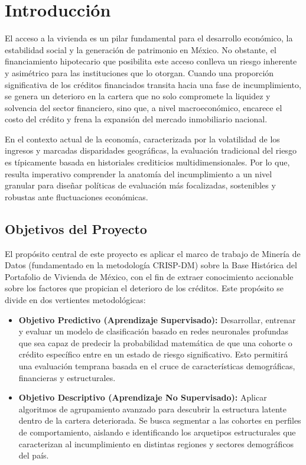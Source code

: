 \section{Introducción}

El acceso a la vivienda es un pilar fundamental para el desarrollo económico, la estabilidad social y la generación de patrimonio en México. No obstante, el financiamiento hipotecario que posibilita este acceso conlleva un riesgo inherente y asimétrico para las instituciones que lo otorgan. Cuando una proporción significativa de los créditos financiados transita hacia una fase de incumplimiento, se genera un deterioro en la cartera que no solo compromete la liquidez y solvencia del sector financiero, sino que, a nivel macroeconómico, encarece el costo del crédito y frena la expansión del mercado inmobiliario nacional. 

En el contexto actual de la economía, caracterizada por la volatilidad de los ingresos y marcadas disparidades geográficas, la evaluación tradicional del riesgo es típicamente basada en historiales crediticios multidimensionales. Por lo que, resulta imperativo comprender la anatomía del incumplimiento a un nivel granular para diseñar políticas de evaluación más focalizadas, sostenibles y robustas ante fluctuaciones económicas.

\subsection{Objetivos del Proyecto}
El propósito central de este proyecto es aplicar el marco de trabajo de Minería de Datos (fundamentado en la metodología CRISP-DM) sobre la Base Histórica del Portafolio de Vivienda de México, con el fin de extraer conocimiento accionable sobre los factores que propician el deterioro de los créditos. Este propósito se divide en dos vertientes metodológicas:

\begin{itemize}
	\item \textbf{Objetivo Predictivo (Aprendizaje Supervisado):} Desarrollar, entrenar y evaluar un modelo de clasificación basado en redes neuronales profundas que sea capaz de predecir la probabilidad matemática de que una cohorte o crédito específico entre en un estado de riesgo significativo. Esto permitirá una evaluación temprana basada en el cruce de características demográficas, financieras y estructurales.
	\item \textbf{Objetivo Descriptivo (Aprendizaje No Supervisado):} Aplicar algoritmos de agrupamiento avanzado para descubrir la estructura latente dentro de la cartera deteriorada. Se busca segmentar a las cohortes en perfiles de comportamiento, aislando e identificando los arquetipos estructurales que caracterizan al incumplimiento en distintas regiones y sectores demográficos del país.
\end{itemize}

